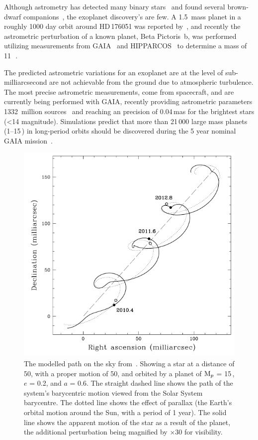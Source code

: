 Although astrometry has detected many binary stars~\citep[e.g.][]{gontcharov_new_2000} and found several brown-dwarf companions~\citep[e.g.][]{sahlmann_search_2011}, the exoplanet discovery's are few.
A 1.5\,\Mjup{} mass planet in a roughly 1000 day orbit around {HD\,176051} was reported by~\citet{muterspaugh_phases_2010}, and recently the astrometric perturbation of a known planet, {Beta Pictoris~b}, was performed utilizing measurements from {GAIA}~\citep{gaiacollaboration_gaia_2016} and {HIPPARCOS}~\citep{esa_hipparcos_1997} to determine a mass of 11\,\Mjup~\citep{snellen_mass_2018}.

The predicted astrometric variations for an exoplanet are at the level of sub-milliarcsecond are not achievable from the ground due to atmospheric turbulence.
The most precise astrometric measurements, come from spacecraft, and are currently being performed with GAIA, recently providing astrometric parameters 1332~million sources~\citep{collaboration_gaia_2018} and reaching an precision of 0.04\,mas for the brightest stars (<14 magnitude).
Simulations predict that more than 21\,000 large mass planets (1--15\,\Mjup) in long-period orbits should be discovered during the 5 year nominal GAIA mission~\citep{perryman_astrometric_2014}.

\begin{figure}
    \centering
    \includegraphics[width=0.5\linewidth]{./figures/introduction/Astrometry_Perryman2000.png}
    \caption{The modelled path on the sky from~\citet{perryman_extrasolar_2000}. Showing a star at a distance of 50\pc, with a proper motion of 50\masperyr{},
        and orbited by a planet of $\textrm{M}_{p}$ = 15\,\Mjup{}, $e$ = 0.2, and $a$ = 0.6\AU{}.
        The straight dashed line shows the path of the system's barycentric motion viewed from the Solar System barycentre.
        The dotted line shows the effect of parallax (the Earth's orbital motion around the Sun, with a period of 1 year).
       The solid line shows the apparent motion of the star as a result of the planet, the additional perturbation being magnified by $\times 30$ for visibility.
    }
    \label{fig:astrometry_perryman}
\end{figure}


